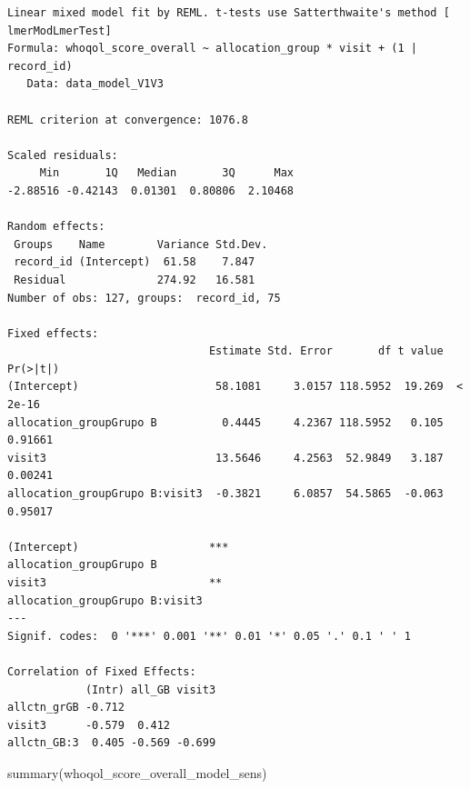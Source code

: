 \documentclass[
  letterpaper,
  DIV=11,
  numbers=noendperiod]{scrartcl}
\newenvironment{Shaded}{\begin{snugshade}}{\end{snugshade}}
\newcommand{\FunctionTok}[1]{\textcolor[rgb]{0.28,0.35,0.67}{#1}}
\newcommand{\NormalTok}[1]{\textcolor[rgb]{0.00,0.23,0.31}{#1}}
\begin{document}
\begin{verbatim}
Linear mixed model fit by REML. t-tests use Satterthwaite's method [
lmerModLmerTest]
Formula: whoqol_score_overall ~ allocation_group * visit + (1 | record_id)
   Data: data_model_V1V3

REML criterion at convergence: 1076.8

Scaled residuals: 
     Min       1Q   Median       3Q      Max 
-2.88516 -0.42143  0.01301  0.80806  2.10468 

Random effects:
 Groups    Name        Variance Std.Dev.
 record_id (Intercept)  61.58    7.847  
 Residual              274.92   16.581  
Number of obs: 127, groups:  record_id, 75

Fixed effects:
                               Estimate Std. Error       df t value Pr(>|t|)
(Intercept)                     58.1081     3.0157 118.5952  19.269  < 2e-16
allocation_groupGrupo B          0.4445     4.2367 118.5952   0.105  0.91661
visit3                          13.5646     4.2563  52.9849   3.187  0.00241
allocation_groupGrupo B:visit3  -0.3821     6.0857  54.5865  -0.063  0.95017
                                  
(Intercept)                    ***
allocation_groupGrupo B           
visit3                         ** 
allocation_groupGrupo B:visit3    
---
Signif. codes:  0 '***' 0.001 '**' 0.01 '*' 0.05 '.' 0.1 ' ' 1

Correlation of Fixed Effects:
            (Intr) all_GB visit3
allctn_grGB -0.712              
visit3      -0.579  0.412       
allctn_GB:3  0.405 -0.569 -0.699
\end{verbatim}

\begin{Shaded}
\begin{Highlighting}[]
\FunctionTok{summary}\NormalTok{(whoqol\_score\_overall\_model\_sens)}
\end{Highlighting}
\end{Shaded}
\end{document}

